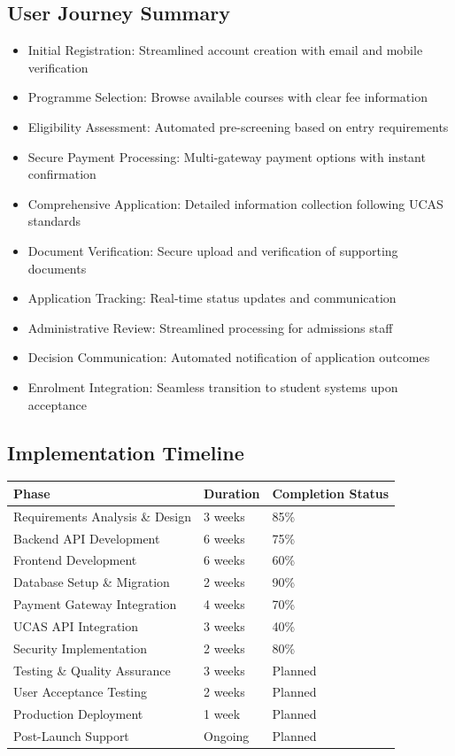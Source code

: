 \documentclass[11pt]{article}
\begin{document}
\subsection{User Journey Summary}
\begin{itemize}
    \item Initial Registration: Streamlined account creation with email and mobile verification
    \item Programme Selection: Browse available courses with clear fee information
    \item Eligibility Assessment: Automated pre-screening based on entry requirements
    \item Secure Payment Processing: Multi-gateway payment options with instant confirmation
    \item Comprehensive Application: Detailed information collection following UCAS standards
    \item Document Verification: Secure upload and verification of supporting documents
    \item Application Tracking: Real-time status updates and communication
    \item Administrative Review: Streamlined processing for admissions staff
    \item Decision Communication: Automated notification of application outcomes
    \item Enrolment Integration: Seamless transition to student systems upon acceptance
\end{itemize}

\subsection{Implementation Timeline}
\begin{tabular}{|l|l|l|}
    \hline
    \textbf{Phase} & \textbf{Duration} & \textbf{Completion Status} \\
    \hline
    Requirements Analysis \& Design & 3 weeks & 85\% \\
    Backend API Development & 6 weeks & 75\% \\
    Frontend Development & 6 weeks & 60\% \\
    Database Setup \& Migration & 2 weeks & 90\% \\
    Payment Gateway Integration & 4 weeks & 70\% \\
    UCAS API Integration & 3 weeks & 40\% \\
    Security Implementation & 2 weeks & 80\% \\
    Testing \& Quality Assurance & 3 weeks & Planned \\
    User Acceptance Testing & 2 weeks & Planned \\
    Production Deployment & 1 week & Planned \\
    Post-Launch Support & Ongoing & Planned \\
    \hline
\end{tabular}
\label{tab:timeline}
\vspace{1em}
\end{document}
